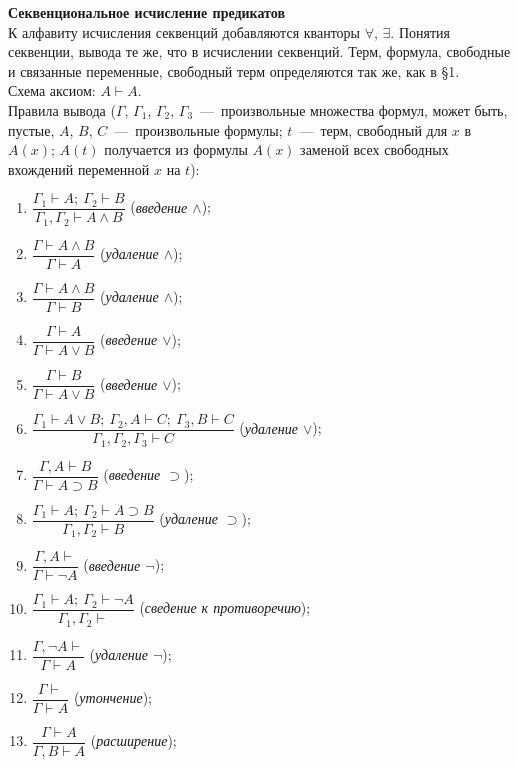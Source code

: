 \textbf{Секвенциональное исчисление предикатов} \\
К алфавиту исчисления секвенций добавляются кванторы $\forall$, $\exists$. Понятия секвенции, вывода те же, что в исчислении секвенций. Терм, формула, свободные и связанные переменные, свободный терм определяются так же, как в \S1. \\
Схема аксиом: $A \vdash A$. \\
Правила вывода ($\Gamma$, $\Gamma_1$, $\Gamma_2$, $\Gamma_3$~---~произвольные множества формул, может быть, пустые, $A$, $B$, $C$~---~произвольные формулы; $t$~---~терм, свободный для $x$ в $A(x)$; $A(t)$ получается из формулы $A(x)$ заменой всех свободных вхождений переменной $x$ на $t$):
\begin{enumerate}[label=\arabic*)]
    \item $\dfrac{\Gamma_1 \vdash A;\ \Gamma_2 \vdash B}{\Gamma_1, \Gamma_2 \vdash A \land B}$ (\textit{введение $\land$});
    \item $\dfrac{\Gamma \vdash A \land B}{\Gamma \vdash A}$ (\textit{удаление $\land$});
    \item $\dfrac{\Gamma \vdash A \land B}{\Gamma \vdash B}$ (\textit{удаление $\land$});
    \item $\dfrac{\Gamma \vdash A}{\Gamma \vdash A \lor B}$ (\textit{введение $\lor$});
    \item $\dfrac{\Gamma \vdash B}{\Gamma \vdash A \lor B}$ (\textit{введение $\lor$});
    \item $\dfrac{\Gamma_1 \vdash A \lor B;\ \Gamma_2, A \vdash C;\ \Gamma_3, B \vdash C}{\Gamma_1, \Gamma_2, \Gamma_3 \vdash C}$ (\textit{удаление $\lor$});
    \item $\dfrac{\Gamma, A \vdash B}{\Gamma \vdash A \supset B}$ (\textit{введение $\supset$});
    \item $\dfrac{\Gamma_1 \vdash A;\ \Gamma_2 \vdash A \supset B}{\Gamma_1, \Gamma_2 \vdash B}$ (\textit{удаление $\supset$});
    \item $\dfrac{\Gamma, A \vdash}{\Gamma \vdash \neg A}$ (\textit{введение $\neg$});
    \item $\dfrac{\Gamma_1 \vdash A;\ \Gamma_2 \vdash \neg A}{\Gamma_1, \Gamma_2 \vdash}$ (\textit{сведение к противоречию});
    \item $\dfrac{\Gamma, \neg A \vdash}{\Gamma \vdash A}$ (\textit{удаление $\neg$});
    \item $\dfrac{\Gamma \vdash}{\Gamma \vdash A}$ (\textit{утончение});
    \item $\dfrac{\Gamma \vdash A}{\Gamma, B \vdash A}$ (\textit{расширение});

\end{enumerate}
